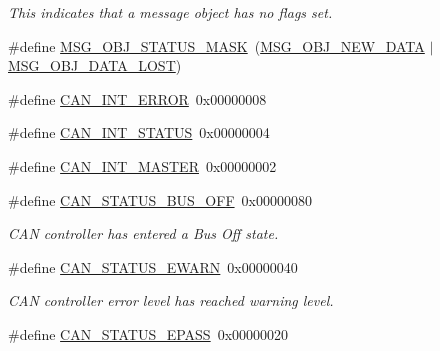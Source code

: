 \begin{DoxyCompactItemize}
\begin{DoxyCompactList}\small\item\em This indicates that a message object has no flags set. \end{DoxyCompactList}\item 
\#define \hyperlink{group__can__api_gac00ece1facc432a0454b9de2e35ad9ad}{M\+S\+G\+\_\+\+O\+B\+J\+\_\+\+S\+T\+A\+T\+U\+S\+\_\+\+M\+A\+SK}~(\hyperlink{group__can__api_ga3c0e245fe4dcf8cb1d987c6a4ff3fc0a}{M\+S\+G\+\_\+\+O\+B\+J\+\_\+\+N\+E\+W\+\_\+\+D\+A\+TA} $\vert$ \hyperlink{group__can__api_ga6405afc8e3cc146889ea8bc32bd0f0ca}{M\+S\+G\+\_\+\+O\+B\+J\+\_\+\+D\+A\+T\+A\+\_\+\+L\+O\+ST})
\item 
\#define \hyperlink{group__can__api_gaaeedfcc6f76b6f3edc4e389eb66969a7}{C\+A\+N\+\_\+\+I\+N\+T\+\_\+\+E\+R\+R\+OR}~0x00000008
\item 
\#define \hyperlink{group__can__api_ga9b574346c3ba9d87d77e39051c7361ef}{C\+A\+N\+\_\+\+I\+N\+T\+\_\+\+S\+T\+A\+T\+US}~0x00000004
\item 
\#define \hyperlink{group__can__api_ga7e4406f4eca9ad39d1062708d4afdcb0}{C\+A\+N\+\_\+\+I\+N\+T\+\_\+\+M\+A\+S\+T\+ER}~0x00000002
\item 
\#define \hyperlink{group__can__api_ga128af659ae92e97d117a488dbe31655c}{C\+A\+N\+\_\+\+S\+T\+A\+T\+U\+S\+\_\+\+B\+U\+S\+\_\+\+O\+FF}~0x00000080\hypertarget{group__can__api_ga128af659ae92e97d117a488dbe31655c}{}\label{group__can__api_ga128af659ae92e97d117a488dbe31655c}

\begin{DoxyCompactList}\small\item\em C\+AN controller has entered a Bus Off state. \end{DoxyCompactList}\item 
\#define \hyperlink{group__can__api_ga598142e112fd7dcdf29227ddc3a18628}{C\+A\+N\+\_\+\+S\+T\+A\+T\+U\+S\+\_\+\+E\+W\+A\+RN}~0x00000040\hypertarget{group__can__api_ga598142e112fd7dcdf29227ddc3a18628}{}\label{group__can__api_ga598142e112fd7dcdf29227ddc3a18628}

\begin{DoxyCompactList}\small\item\em C\+AN controller error level has reached warning level. \end{DoxyCompactList}\item 
\#define \hyperlink{group__can__api_ga0ad72c583aeccf70ca41a458a4c4a418}{C\+A\+N\+\_\+\+S\+T\+A\+T\+U\+S\+\_\+\+E\+P\+A\+SS}~0x00000020\hypertarget{group__can__api_ga0ad72c583aeccf70ca41a458a4c4a418}{}\label{group__can__api_ga0ad72c583aeccf70ca41a458a4c4a418}


\end{DoxyCompactItemize}
